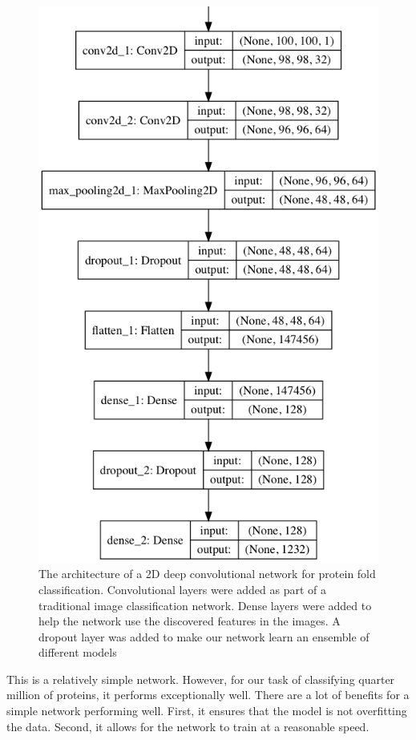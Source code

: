 \documentclass[12pt, a4paper, twocolumn, fullpage]{article}
\theoremstyle{plain}
\theoremstyle{definition}
\theoremstyle{remark}
\begin{document}
\begin{figure}
\includegraphics[width=.9\linewidth]{model_plot.png}
\caption{The architecture of a 2D deep convolutional network for protein fold classification. Convolutional layers were added as part of a traditional image classification network. Dense layers were added to help the network use the discovered features in the images. A dropout layer was added to make our network learn an ensemble of different models}
\label{model_plot}
\end{figure}

This is a relatively simple network. However, for our task of classifying quarter million of proteins, it performs exceptionally well. There are a lot of benefits for a simple network performing well. First, it ensures that the model is not overfitting the data. Second, it allows for the network to train at a reasonable speed.
\end{document}
